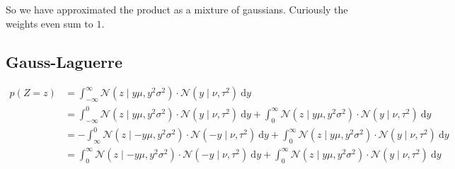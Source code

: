 \documentclass[11pt,a4paper]{book}
\begin{document}
So we have approximated the product as a mixture of gaussians. Curiously the
weights even sum to $1$.

\subsection{Gauss-Laguerre}

\begin{align*}
  p(Z = z) & = \int_{-\infty}^{\infty} \mathcal{N}\left( z \mid y\mu, y^{2}\sigma^{2} \right) \cdot \mathcal{N}(y \mid \nu, \tau^{2})~\mathrm{d}y\\
           & = \int_{-\infty}^{0} \mathcal{N}\left( z \mid y\mu, y^{2}\sigma^{2} \right) \cdot \mathcal{N}(y \mid \nu, \tau^{2})~\mathrm{d}y + \int_{0}^{\infty} \mathcal{N}\left( z \mid y\mu, y^{2}\sigma^{2} \right) \cdot \mathcal{N}(y \mid \nu, \tau^{2})~\mathrm{d}y\\
           & = -\int_{\infty}^{0} \mathcal{N}\left( z \mid -y\mu, y^{2}\sigma^{2} \right) \cdot \mathcal{N}(-y \mid \nu, \tau^{2})~\mathrm{d}y + \int_{0}^{\infty} \mathcal{N}\left( z \mid y\mu, y^{2}\sigma^{2} \right) \cdot \mathcal{N}(y \mid \nu, \tau^{2})~\mathrm{d}y\\
           & = \int_{0}^{\infty} \mathcal{N}\left( z \mid -y\mu, y^{2}\sigma^{2} \right) \cdot \mathcal{N}(-y \mid \nu, \tau^{2})~\mathrm{d}y + \int_{0}^{\infty} \mathcal{N}\left( z \mid y\mu, y^{2}\sigma^{2} \right) \cdot \mathcal{N}(y \mid \nu, \tau^{2})~\mathrm{d}y\\
\end{align*}
\end{document}
